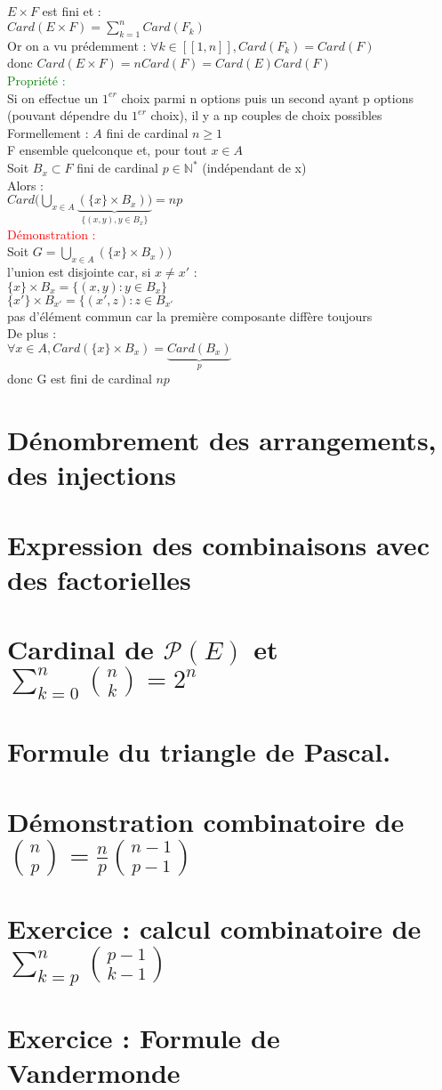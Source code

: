 \documentclass{article}
\begin{document}
$E \times F$ est fini et : \\
$Card(E\times F)= \sum_{k=1}^n Card(F_k)$ \\
Or on a vu prédemment : $\forall k \in [[1,n]], Card(F_k)=Card(F)$ \\
donc $Card(E \times F) = n Card(F)=Card(E) Card(F)$ \\
\textcolor{green}{Propriété :} \\
Si on effectue un $1^{er}$ choix parmi n options puis un second ayant p options (pouvant dépendre du $1^{er}$ choix), il y a np couples de choix possibles \\
Formellement : $A$ fini de cardinal $n \geq 1$ \\
F ensemble quelconque et, pour tout $x \in A$ \\
Soit $B_x \subset F$ fini de cardinal $p \in \mathbb N^*$ (indépendant de x) \\
Alors : \\
$Card ( \bigcup_{x \in A}\underbrace{(\lbrace x \rbrace \times B_x))}_{\lbrace (x,y),y\in B_x \rbrace}=np$ \\
\textcolor{red}{Démonstration :} \\
Soit $G= \bigcup_{x \in A} {(\lbrace x \rbrace \times B_x))}$ \\
l'union est disjointe car, si $x \neq x'$ : \\
$\lbrace x \rbrace \times B_x = \lbrace (x,y) : y\in B_x \rbrace $ \\
$ \lbrace x' \rbrace \times B_{x'}=\lbrace (x',z) : z \in B_{x'}$ \\
pas d'élément commun car la première composante diffère toujours \\
De plus : \\
$\forall x \in A, Card(\lbrace x \rbrace \times B_x)= \underbrace{Card(B_x)}_{p}$ \\
donc G est fini de cardinal $np$
\section{Dénombrement des arrangements, des injections}
\section{Expression des combinaisons avec des factorielles}
\section{Cardinal de $\mathcal P (E)$ et $\sum_{k=0}^n \binom{n}{k}=2^n$ }
\section{Formule du triangle de Pascal.}
\section{Démonstration combinatoire de $\binom{n}{p}= \frac n p \binom{n-1}{p-1}$}
\section{Exercice : calcul combinatoire de $\sum_{k=p}^n \binom{p-1}{k-1} $ }
\section{ Exercice : Formule de Vandermonde}
\end{document}
